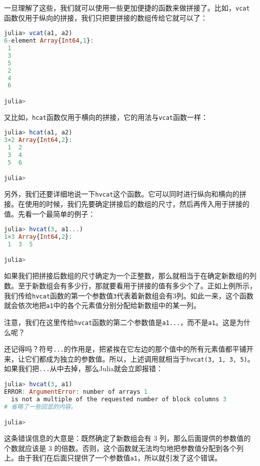 一旦理解了这些，我们就可以使用一些更加便捷的函数来做拼接了。比如，\verb|vcat|函数仅用于纵向的拼接，我们只把要拼接的数组传给它就可以了：

\begin{lstlisting}[language=julia]
julia> vcat(a1, a2)
6-element Array{Int64,1}:
 1
 3
 5
 2
 4
 6

julia>
\end{lstlisting}

又比如，\verb|hcat|函数仅用于横向的拼接，它的用法与\verb|vcat|函数一样：

\begin{lstlisting}[language=julia]
julia> hcat(a1, a2)
3×2 Array{Int64,2}:
 1  2
 3  4
 5  6

julia> 
\end{lstlisting}

另外，我们还要详细地说一下\verb|hvcat|这个函数。它可以同时进行纵向和横向的拼接。在使用的时候，我们先要确定拼接后的数组的尺寸，然后再传入用于拼接的值。先看一个最简单的例子：

\begin{lstlisting}[language=julia]
julia> hvcat(3, a1...)
1×3 Array{Int64,2}:
 1  3  5

julia> 
\end{lstlisting}

如果我们把拼接后数组的尺寸确定为一个正整数，那么就相当于在确定新数组的列数。至于新数组会有多少行，那就要看用于拼接的值有多少个了。正如上例所示，我们传给\verb|hvcat|函数的第一个参数值\verb|3|代表着新数组会有3列。如此一来，这个函数就会依次地把\verb|a1|中的各个元素值分别分配给新数组中的某一列。

注意，我们在这里传给\verb|hvcat|函数的第二个参数值是\verb|a1...|，而不是\verb|a1|。这是为什么呢？

还记得吗？符号\verb|...|的作用是，把紧挨在它左边的那个值中的所有元素值都平铺开来，让它们都成为独立的参数值。所以，上述调用就相当于\verb|hvcat(3, 1, 3, 5)|。如果我们把\verb|...|从中去掉，那么Julia就会立即报错：

\begin{lstlisting}[language=julia]
julia> hvcat(3, a1)
ERROR: ArgumentError: number of arrays 1 
  is not a multiple of the requested number of block columns 3
# 省略了一些回显的内容。

julia> 
\end{lstlisting}

这条错误信息的大意是：既然确定了新数组会有 3 列，那么后面提供的参数值的个数就应该是 3 的倍数。否则，这个函数就无法均匀地把参数值分配到各个列上。由于我们在后面只提供了一个参数值\verb|a1|，所以就引发了这个错误。

